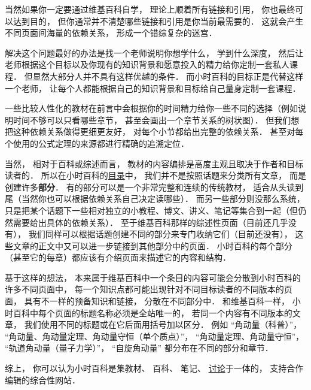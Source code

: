 当然如果你一定要通过维基百科自学， 理论上顺着所有链接和引用， 你也最终可以达到目的， 但你通常并不清楚哪些链接和引用是你当前最需要的． 这就会产生不同页面间海量的依赖关系， 形成一个错综复杂的迷宫．

解决这个问题最好的办法是找一个老师说明你想学什么， 学到什么深度， 然后让老师根据这个目标以及你现有的知识背景和愿意投入的精力给你定制一套私人课程． 但显然大部分人并不具有这样优越的条件． 而小时百科的目标正是代替这样一个老师， 让每个人都能根据自己的知识背景和目标给自己量身定制一套课程．

一些比较人性化的教材在前言中会根据你的时间精力给你一些不同的选择（例如说明时间不够可以只看哪些章节， 甚至会画出一个章节关系的树状图）． 但我们想把这种依赖关系做得更细更友好， 对每个小节都给出完整的依赖关系． 甚至对每个使用的公式定理的来源都进行精确的追溯定位．

当然， 相对于百科或综述而言， 教材的内容编排是高度主观且取决于作者和目标读者的． 所以在小时百科的\href{http://wuli.wiki/online}{目录}中， 我们并不是按照话题来分类所有文章， 而是创建许多\textbf{部分}． 有的部分可以是一个非常完整和连续的传统教材， 适合从头读到尾（当然你也可以根据依赖关系自己决定读哪些）． 而另一些部分则没那么系统， 只是把某个话题下一些相对独立的小教程、博文、讲义、笔记等集合到一起（但仍然需要给出具体的依赖关系）． 至于维基百科那样的综述性页面（目前还几乎没有）， 我们同样可以根据话题创建不同的部分来专门收纳它们（目前还没有）， 这些文章的正文中又可以进一步链接到其他部分中的页面． 小时百科的每个部分（甚至它的每章）都应该有介绍页面来描述它的内容和结构．

基于这样的想法， 本来属于维基百科中一个条目的内容可能会分散到小时百科的许多不同页面中， 每一个知识点都可能出现针对不同目标读者的不同版本的页面， 具有不一样的预备知识和链接， 分散在不同部分中． 和维基百科一样， 小时百科中每个页面的标题名称必须是全站唯一的， 若同一个内容有不同版本的文章， 我们使用不同的标题或在它后面用括号加以区分． 例如 “角动量（科普）”， “角动量、角动量定理、角动量守恒（单个质点）”， “角动量定理、角动量守恒”， “轨道角动量（量子力学）”， “自旋角动量” 都分布在不同的部分和章节．

综上， 你可以认为小时百科是集教材、 百科、 笔记、 \href{http://wuli.wiki/forum}{讨论}于一体的， 支持合作编辑的综合性网站．


